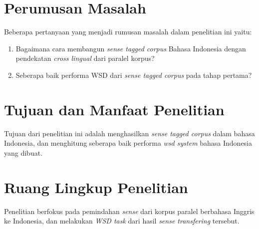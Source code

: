 \section{Perumusan Masalah}
Beberapa pertanyaan yang menjadi rumusan masalah dalam penelitian ini yaitu:
\begin{enumerate}
	\item Bagaimana cara membangun \textit{sense tagged corpus} Bahasa Indonesia dengan pendekatan \textit{cross lingual} dari paralel korpus?
	\item Seberapa baik performa WSD dari \textit{sense tagged corpus} pada tahap pertama?
\end{enumerate}

\section{Tujuan dan Manfaat Penelitian}
Tujuan dari penelitian ini adalah menghasilkan \textit{sense tagged corpus} dalam bahasa Indonesia, dan menghitung seberapa baik performa \textit{wsd system} bahasa Indonesia yang dibuat.
\section{Ruang Lingkup Penelitian}
Penelitian berfokus pada pemindahan \textit{sense} dari korpus paralel berbahasa Inggris ke Indonesia, dan melakukan \textit{WSD task} dari hasil \textit{sense transfering} tersebut.
